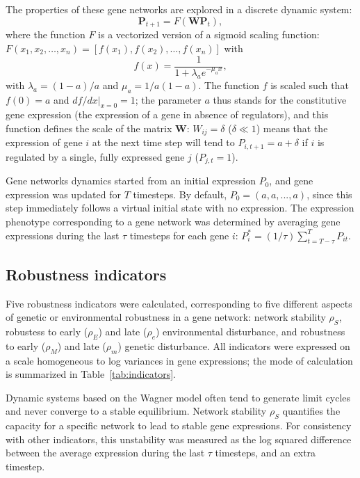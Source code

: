 \documentclass[10pt,a4paper]{article}
\newcommand{\stability}{{\rho_S}}
\newcommand{\earlyenv}{{\rho_E}}
\newcommand{\lateenv}{{\rho_e}}
\newcommand{\earlymut}{{\rho_M}}
\newcommand{\latemut}{{\rho_m}}
\begin{document}
The properties of these gene networks are explored in a discrete dynamic system:
\begin{equation}
 \bm P_{t+1} = F(\bm W \bm P_t),
\end{equation}
\noindent where the function $F$ is a vectorized version of a sigmoid scaling function: $F(x_1, x_2, \dots, x_n) = [f(x_1), f(x_2), \dots, f(x_n)]$ with
\begin{equation} \label{eq:fx}
f(x) = \frac{1}{1+ \lambda_a e ^{- \mu_a x}}, 
\end{equation}
\noindent with $\lambda_a = (1-a)/a$ and $\mu_a = 1/a(1-a)$. The function $f$ is scaled such that $f(0) = a$ and $df/dx|_{x=0}=1$; the parameter $a$ thus stands for the constitutive gene expression (the expression of a gene in absence of regulators), and this function defines the scale of the matrix $\bm W$: $W_{ij} = \delta$ ($\delta \ll 1$) means that the expression of gene $i$ at the next time step will tend to $P_{i,t+1} = a + \delta$ if $i$ is regulated by a single, fully expressed gene $j$ ($P_{j,t} = 1$).

Gene networks dynamics started from an initial expression $P_0$, and gene expression was updated for $T$ timesteps. By default, $P_0 = (a, a, ..., a)$, since this step immediately follows a virtual initial state with no expression. The expression phenotype corresponding to a gene network was determined by averaging gene expressions during the last $\tau$ timesteps for each gene $i$: $P_i^* = (1/\tau)\sum_{t=T-\tau}^T P_{it}$. 

\subsection{Robustness indicators}

Five robustness indicators were calculated, corresponding to five different aspects of genetic or environmental robustness in a gene network: network stability $\stability$, robustess to early ($\earlyenv$) and late ($\lateenv$) environmental disturbance, and robustness to early ($\earlymut$) and late ($\latemut$) genetic disturbance. All indicators were expressed on a scale homogeneous to log variances in gene expressions; the mode of calculation is summarized in Table~\ref{tab:indicators}. 

Dynamic systems based on the Wagner model often tend to generate limit cycles and never converge to a stable equilibrium. Network stability $\stability$ quantifies the capacity for a specific network to lead to stable gene expressions.  For consistency with other indicators, this unstability was measured as the log squared difference between the average expression during the last $\tau$ timesteps, and an extra timestep. 
\end{document}
